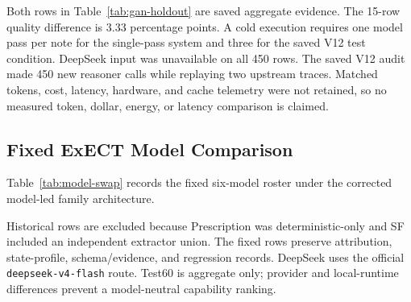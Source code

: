 \documentclass[conference]{IEEEtran}
\newcommand{\code}[1]{\texttt{#1}}
\begin{document}
Both rows in Table~\ref{tab:gan-holdout} are saved aggregate evidence. The
15-row quality difference is 3.33 percentage points. A cold execution requires
one model pass per note for the single-pass system and three for the saved V12
test condition. DeepSeek input was unavailable on all 450 rows. The saved V12
audit made 450 new reasoner calls while replaying two upstream traces.
Matched tokens, cost, latency, hardware, and cache telemetry were not retained,
so no measured token, dollar, energy, or latency comparison is claimed.

\subsection{Fixed ExECT Model Comparison}

Table~\ref{tab:model-swap} records the fixed six-model roster under the
corrected model-led family architecture.

\begin{table}[!t]
\caption{Fixed ExECT Six-Model Comparison}
\label{tab:model-swap}
\centering
\scriptsize
{}
\end{table}

Historical rows are excluded because Prescription was deterministic-only and SF
included an independent extractor union. The fixed rows preserve attribution,
state-profile, schema/evidence, and regression records. DeepSeek uses the
official \code{deepseek-v4-flash} route. Test60 is
aggregate only; provider and local-runtime differences prevent a model-neutral
capability ranking.
\end{document}
